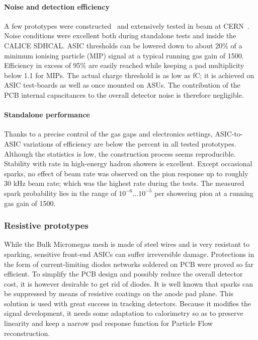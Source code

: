 \paragraph{Noise and detection efficiency}
A few prototypes were constructed~\cite{Adloff201390} and extensively tested in beam at CERN~\cite{Adloff:2014qea}. Noise conditions were excellent both during standalone tests and inside the CALICE SDHCAL. ASIC thresholds can be lowered down to about 20\% of a minimum ionising particle (MIP) signal at a typical running gas gain of 1500. Efficiency in excess of 95\% are easily reached while keeping a pad multiplicity below 1.1 for MIPs. The actual charge threshold is as low as \unit[1--2]{fC}; it is achieved on ASIC test-boards as well as once mounted on ASUs. The contribution of the PCB internal capacitances to the overall detector noise is therefore negligible.

\paragraph{Standalone performance}
Thanks to a precise control of the gas gaps and electronics settings, ASIC-to-ASIC variations of efficiency are below the percent in all tested prototypes. Although the statistics is low, the construction process seems reproducible. Stability with rate in high-energy hadron showers is excellent. Except occasional sparks, no effect of beam rate was observed on the pion response up to roughly 30 kHz beam rate; which was the highest rate during the tests. The measured spark probability lies in the range of $10^{-6} \ldots 10^{-5}$ per showering pion at a running gas gain of 1500.

\subsubsection{Resistive prototypes}

While the Bulk Micromegas mesh is made of steel wires and is very resistant to sparking, sensitive front-end ASICs can suffer irreversible damage. Protections in the form of current-limiting diodes networks soldered on PCB were proved so far efficient. To simplify the PCB design and possibly reduce the overall detector cost, it is however desirable to get rid of diodes. It is well known that sparks can be suppressed by means of resistive coatings on the anode pad plane. This solution is used with great success in tracking detectors. Because it modifies the signal development, it needs some adaptation to calorimetry so as to preserve linearity and keep a narrow pad response function for Particle Flow reconstruction.


